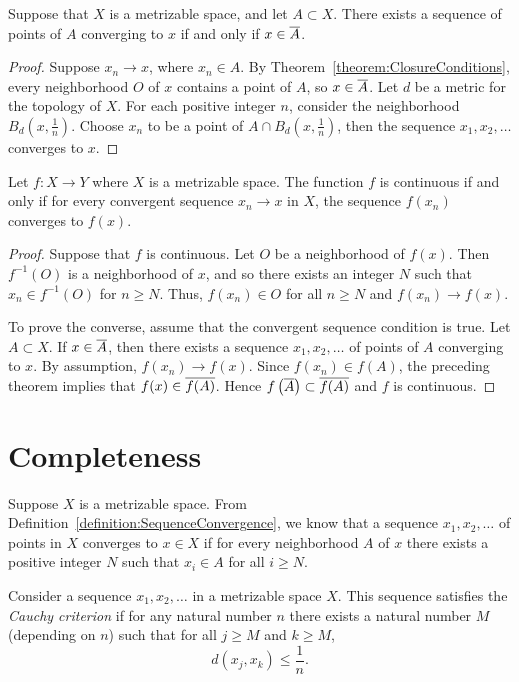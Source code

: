 \begin{theorem}
Suppose that $X$ is a metrizable space, and let $A \subset X$.
There exists a sequence of points of $A$ converging to $x$ if and only if $x \in \overline{A}$.
\end{theorem}
\begin{proof}
Suppose $x_n \rightarrow x$, where $x_n \in A$.
By Theorem~\ref{theorem:ClosureConditions}, every neighborhood $O$ of $x$ contains a point of $A$, so $x \in \overline{A}$.
Let $d$ be a metric for the topology of $X$.
For each positive integer $n$, consider the neighborhood $B_d \left( x, \frac{1}{n} \right)$.
Choose $x_n$ to be a point of $A \cap B_d \left( x, \frac{1}{n} \right)$,
then the sequence $x_1, x_2, \ldots$ converges to $x$.
\end{proof}

\begin{theorem}
Let $f: X \rightarrow Y$ where $X$ is a metrizable space.
The function $f$ is continuous if and only if for every convergent sequence $x_n \rightarrow x$ in $X$, the sequence $f(x_n)$ converges to $f(x)$.
\end{theorem}
\begin{proof}
Suppose that $f$ is continuous.
Let $O$ be a neighborhood of $f(x)$.
Then $f^{-1}(O)$ is a neighborhood of $x$, and so there exists an integer $N$ such that $x_n \in f^{-1}(O)$ for $n \geq N$.
Thus, $f(x_n) \in O$ for all $n \geq N$ and $f(x_n) \rightarrow f(x)$.

To prove the converse, assume that the convergent sequence condition is true.
Let $A \subset X$.
If $x \in \overline{A}$, then there exists a sequence $x_1, x_2, \ldots$ of points of $A$ converging to $x$.
By assumption, $f(x_n) \rightarrow f(x)$.
Since $f(x_n) \in f(A)$, the preceding theorem implies that $f(x) \in \overline{f(A)}$.
Hence $f \left( \overline{A} \right) \subset \overline{f(A)}$ and $f$ is continuous.
\end{proof}


\section{Completeness}

Suppose $X$ is a metrizable space.
From Definition~\ref{definition:SequenceConvergence}, we know that a sequence $x_1, x_2, \ldots$ of points in $X$ converges to $x \in X$ if for every neighborhood $A$ of $x$ there exists a positive integer $N$ such that $x_i \in A$ for all $i \geq N$.

\begin{definition}
Consider a sequence $x_1, x_2, \ldots$ in a metrizable space $X$.
This sequence satisfies the \emph{Cauchy criterion} if for any natural number $n$ there exists a natural number $M$ (depending on $n$) such that for all $j \geq M$ and $k \geq M$,
\begin{equation*}
d \left( x_j, x_k \right) \leq \frac{1}{n}.
\end{equation*}
\end{definition}

